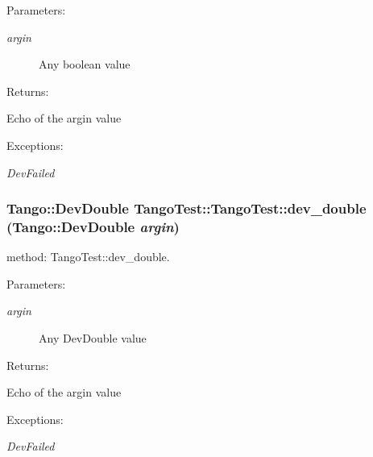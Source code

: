\begin{Desc}
\item[Parameters: ]\par
\begin{description}
\item[{\em 
argin}]Any boolean value \end{description}
\end{Desc}
\begin{Desc}
\item[Returns: ]\par
Echo of the argin value \end{Desc}
\begin{Desc}
\item[Exceptions: ]\par
\begin{description}
\item[{\em 
Dev\-Failed}] \end{description}
\end{Desc}
\subsubsection{\setlength{\rightskip}{0pt plus 5cm}Tango::Dev\-Double Tango\-Test::Tango\-Test::dev\_\-double (Tango::Dev\-Double {\em argin})}\label{classTangoTest_1_1TangoTest_z5_10}


method: Tango\-Test::dev\_\-double.

\begin{Desc}
\item[Parameters: ]\par
\begin{description}
\item[{\em 
argin}]Any Dev\-Double value \end{description}
\end{Desc}
\begin{Desc}
\item[Returns: ]\par
Echo of the argin value \end{Desc}
\begin{Desc}
\item[Exceptions: ]\par
\begin{description}
\item[{\em 
Dev\-Failed}] \end{description}
\end{Desc}
